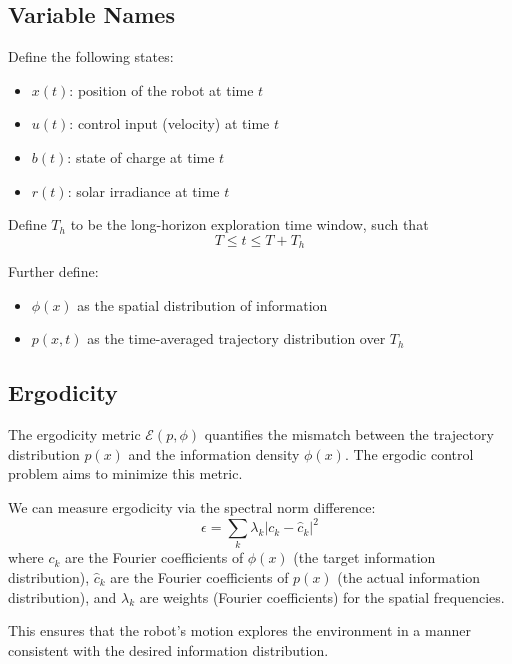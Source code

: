 
\subsection{Variable Names}
Define the following states:
\begin{itemize}
    \item $x(t)$: position of the robot at time $t$
    \item $u(t)$: control input (velocity) at time $t$
    \item $b(t)$: state of charge at time $t$
    \item $r(t)$: solar irradiance at time $t$
\end{itemize}

Define $T_h$ to be the long-horizon exploration time window, such that
\begin{equation}
    T \leq t \leq T + T_h
\end{equation}

Further define:
\begin{itemize}
    \item $\phi(x)$ as the spatial distribution of information
    \item $p(x,t)$ as the time-averaged trajectory distribution over $T_h$
\end{itemize}

\subsection{Ergodicity}
The ergodicity metric $\mathcal{E}(p, \phi)$ quantifies the mismatch between the trajectory distribution $p(x)$ and the information density $\phi(x)$. The ergodic control problem aims to minimize this metric.

We can measure ergodicity via the spectral norm difference:
\begin{equation}
    \epsilon = \sum_k \lambda_k \left| c_k - \hat{c}_k \right|^2
\end{equation}
where $c_k$ are the Fourier coefficients of $\phi(x)$ (the target information distribution), $\hat{c}_k$ are the Fourier coefficients of $p(x)$ (the actual information distribution), and $\lambda_k$ are weights (Fourier coefficients) for the spatial frequencies.


\begin{center}
\begin{tcolorbox}[colback=gray!30, colframe=white, width=\textwidth, boxrule=0pt, arc=0pt, auto outer arc]
    This ensures that the robot's motion explores the environment in a manner consistent with the desired information distribution.
\end{tcolorbox}
\end{center}

